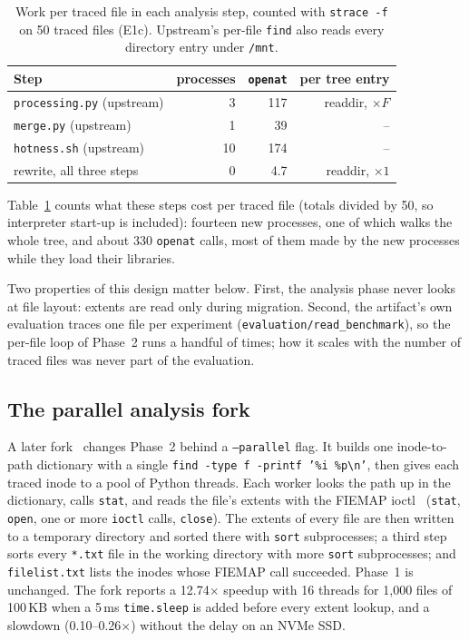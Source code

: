 \begin{table}[t]
\caption{Work per traced file in each analysis step, counted with \texttt{strace -f}
on 50 traced files (E1c). Upstream's per-file \texttt{find} also reads every
directory entry under \texttt{/mnt}.}
\label{tab:anatomy}
\small
\begin{tabular}{@{}lrrr@{}}
\toprule
Step & processes & \texttt{openat} & per tree entry \\
\midrule
\texttt{processing.py} (upstream) & 3 & 117 & readdir, $\times F$ \\
\texttt{merge.py} (upstream) & 1 & 39 & -- \\
\texttt{hotness.sh} (upstream) & 10 & 174 & -- \\
rewrite, all three steps & 0 & 4.7 & readdir, $\times 1$ \\
\bottomrule
\end{tabular}
\end{table}

Table~\ref{tab:anatomy} counts what these steps cost per traced file (totals divided
by 50, so interpreter start-up is included): fourteen new processes, one of which
walks the whole tree, and about 330 \texttt{openat} calls, most of them made by the
new processes while they load their libraries.

Two properties of this design matter below. First, the analysis phase never looks
at file layout: extents are read only during migration. Second, the artifact's own
evaluation traces one file per experiment (\texttt{evaluation/read\_benchmark}), so
the per-file loop of Phase~2 runs a handful of times; how it scales with the number
of traced files was never part of the evaluation.

\subsection{The parallel analysis fork}
A later fork~\cite{forkbranch} changes Phase~2 behind a \texttt{--parallel} flag. It
builds one inode-to-path dictionary with a single
\texttt{find -type f -printf '\%i \%p\textbackslash n'}, then gives each traced
inode to a pool of Python threads. Each worker looks the path up in the dictionary,
calls \texttt{stat}, and reads the file's extents with the FIEMAP
ioctl~\cite{kernelfiemap} (\texttt{stat}, \texttt{open}, one or more
\texttt{ioctl} calls, \texttt{close}). The extents of every file are then written to a
temporary directory and sorted there with \texttt{sort} subprocesses; a third step
sorts every \texttt{*.txt} file in the working directory with more \texttt{sort}
subprocesses; and \texttt{filelist.txt} lists the inodes whose FIEMAP call succeeded.
Phase~1 is unchanged. The fork reports a 12.74$\times$ speedup with 16 threads for
1{,}000 files of 100\,KB when a 5\,ms \texttt{time.sleep} is added before every
extent lookup, and a slowdown (0.10--0.26$\times$) without the delay on an NVMe SSD.

